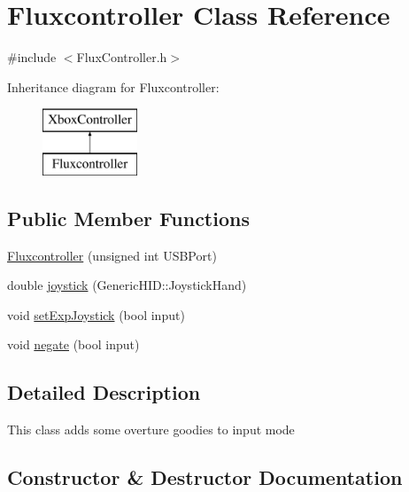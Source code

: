 \hypertarget{classFluxcontroller}{}\section{Fluxcontroller Class Reference}
\label{classFluxcontroller}


{\ttfamily \#include $<$Flux\+Controller.\+h$>$}

Inheritance diagram for Fluxcontroller\+:\begin{figure}[H]
\begin{center}
\leavevmode
\includegraphics[height=2.000000cm]{classFluxcontroller}
\end{center}
\end{figure}
\subsection*{Public Member Functions}
\begin{DoxyCompactItemize}
\item 
\hyperlink{classFluxcontroller_a1451c531fa6e91f5a1a34b7d06286846}{Fluxcontroller} (unsigned int U\+S\+B\+Port)
\item 
double \hyperlink{classFluxcontroller_ab3801948ee5152689b8d8e8ac6e92856}{joystick} (Generic\+H\+I\+D\+::\+Joystick\+Hand)
\item 
void \hyperlink{classFluxcontroller_a82147680c873b1da821dfb48a38f0b9a}{set\+Exp\+Joystick} (bool input)
\item 
void \hyperlink{classFluxcontroller_ac2d888be1a50f85ccbae685171d5359f}{negate} (bool input)
\end{DoxyCompactItemize}


\subsection{Detailed Description}
This class adds some overture goodies to input mode 

\subsection{Constructor \& Destructor Documentation}
\mbox{\label{classFluxcontroller_a1451c531fa6e91f5a1a34b7d06286846}} 
